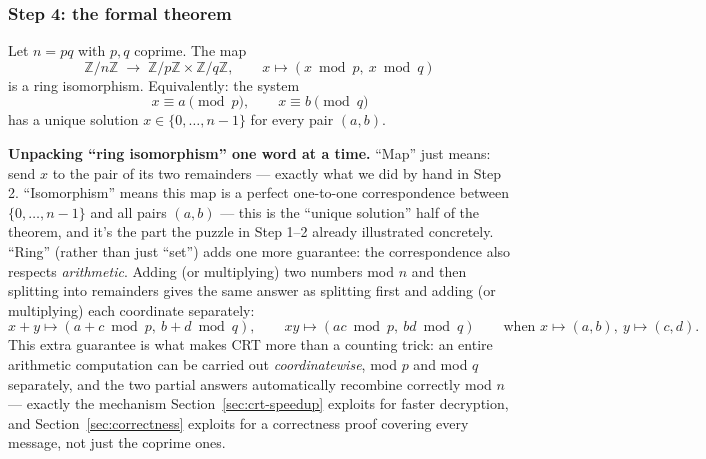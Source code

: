 \subsubsection*{Step 4: the formal theorem}

\begin{theorem}[CRT]\label{thm:crt}
Let $n = pq$ with $p, q$ coprime. The map
\[
\mathbb{Z}/n\mathbb{Z} \;\longrightarrow\; \mathbb{Z}/p\mathbb{Z} \times \mathbb{Z}/q\mathbb{Z}, \qquad x \mapsto (x \bmod p,\ x \bmod q)
\]
is a ring isomorphism. Equivalently: the system
\[
x \equiv a \pmod p, \qquad x \equiv b \pmod q
\]
has a unique solution $x \in \{0, \dots, n-1\}$ for every pair $(a,b)$.
\end{theorem}

\medskip\noindent\textbf{Unpacking ``ring isomorphism'' one word at a time.} ``Map'' just means: send $x$ to the pair of its two remainders — exactly what we did by hand in Step 2. ``Isomorphism'' means this map is a perfect one-to-one correspondence between $\{0,\dots,n-1\}$ and all pairs $(a,b)$ — this is the ``unique solution'' half of the theorem, and it's the part the puzzle in Step 1--2 already illustrated concretely. ``Ring'' (rather than just ``set'') adds one more guarantee: the correspondence also respects \emph{arithmetic}. Adding (or multiplying) two numbers mod $n$ and then splitting into remainders gives the same answer as splitting first and adding (or multiplying) each coordinate separately:
\[
x+y \mapsto (a+c \bmod p,\ b+d \bmod q), \qquad xy \mapsto (ac \bmod p,\ bd \bmod q) \qquad \text{when } x\mapsto(a,b),\ y\mapsto(c,d).
\]
This extra guarantee is what makes CRT more than a counting trick: an entire arithmetic computation can be carried out \emph{coordinatewise}, mod $p$ and mod $q$ separately, and the two partial answers automatically recombine correctly mod $n$ — exactly the mechanism Section~\ref{sec:crt-speedup} exploits for faster decryption, and Section~\ref{sec:correctness} exploits for a correctness proof covering every message, not just the coprime ones.

